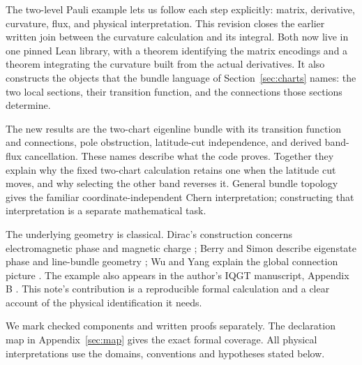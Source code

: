 \documentclass[11pt]{article}
\theoremstyle{definition}\newtheorem{definition}[theorem]{Definition}
\theoremstyle{remark}\newtheorem{remark}[theorem]{Remark}
\begin{document}
The two-level Pauli example lets us follow each step explicitly: matrix, derivative, curvature, flux, and physical interpretation. This revision closes the earlier written join between the curvature calculation and its integral. Both now live in one pinned Lean library, with a theorem identifying the matrix encodings and a theorem integrating the curvature built from the actual derivatives. It also constructs the objects that the bundle language of Section~\ref{sec:charts} names: the two local sections, their transition function, and the connections those sections determine.

The new results are the two-chart eigenline bundle with its transition function and connections, pole obstruction, latitude-cut independence, and derived band-flux cancellation. These names describe what the code proves. Together they explain why the fixed two-chart calculation retains one when the latitude cut moves, and why selecting the other band reverses it. General bundle topology gives the familiar coordinate-independent Chern interpretation; constructing that interpretation is a separate mathematical task.

The underlying geometry is classical. Dirac's construction concerns electromagnetic phase and magnetic charge \cite{dirac}; Berry and Simon describe eigenstate phase and line-bundle geometry \cite{berry,simon}; Wu and Yang explain the global connection picture \cite{wuyang}. The example also appears in the author's IQGT manuscript, Appendix B \cite{iqgt}. This note's contribution is a reproducible formal calculation and a clear account of the physical identification it needs.

We mark checked components and written proofs separately. The declaration map in Appendix~\ref{sec:map} gives the exact formal coverage. All physical interpretations use the domains, conventions and hypotheses stated below.
\end{document}
